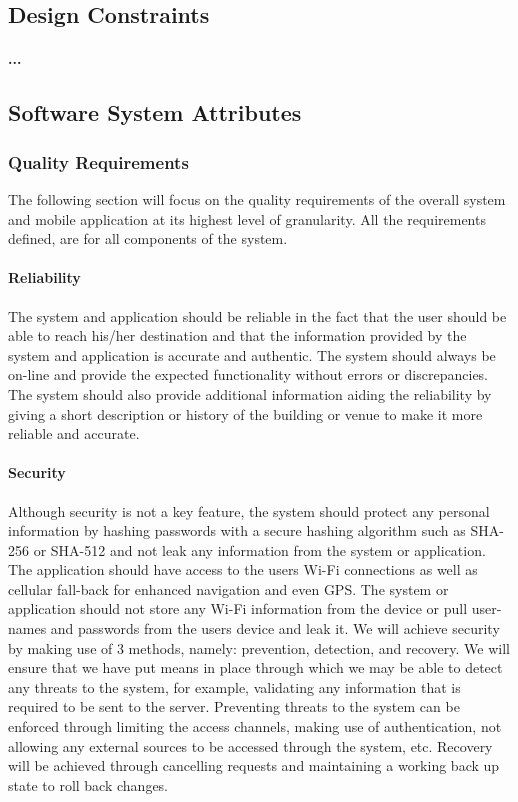 \documentclass[runningheads,a4paper]{article}
\begin{document}
\subsection{Design Constraints}
\paragraph{...}

\subsection{Software System Attributes}
\subsubsection{Quality Requirements }
The following section will focus on the quality requirements of the overall system and mobile application at its highest level of granularity. All the requirements defined, are for all components of the system.

\paragraph{\textbf{Reliability}\\}
The system and application should be reliable in the fact that the user should be able to reach his/her destination and that the information provided by the system and application is accurate and authentic. The system should always be on-line and provide the expected functionality without errors or discrepancies. The system should also provide additional information aiding the reliability by giving a short description or history of the building or venue to make it more reliable and accurate. 

\paragraph{\textbf{Security}\\}
Although security is not a key feature, the system should protect any personal information by hashing passwords with a secure hashing algorithm such as SHA-256 or SHA-512 and not leak any information from the system or application. The application should have access to the users Wi-Fi connections as well as cellular fall-back for enhanced navigation and even GPS. The system or application should not store any Wi-Fi information from the device or pull user-names and passwords from the users device and leak it.
We will achieve security by making use of 3 methods, namely: prevention, detection, and recovery. We will ensure that we have put means in
place through which we may be able to detect any threats to the system,
for example, validating any information that is required to be sent to the
server. Preventing threats to the system can be enforced through limiting the access channels, making use of authentication, not allowing any
external sources to be accessed through the system, etc. Recovery will be
achieved through cancelling requests and maintaining a working back up
state to roll back changes.  
\end{document}
